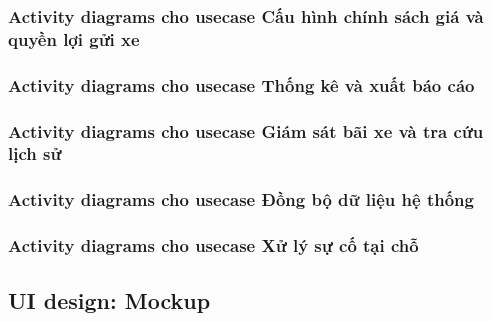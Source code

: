

\newpage

\subsubsection{Activity diagrams cho usecase Cấu hình chính sách giá và quyền lợi gửi xe}




\newpage


\subsubsection{Activity diagrams cho usecase Thống kê và xuất báo cáo}




\newpage


\subsubsection{Activity diagrams cho usecase Giám sát bãi xe và tra cứu lịch sử}



\newpage


\subsubsection{Activity diagrams cho usecase Đồng bộ dữ liệu hệ thống}



\newpage


\subsubsection{Activity diagrams cho usecase Xử lý sự cố tại chỗ}



\newpage


\subsection{\textbf{UI design: Mockup}}


